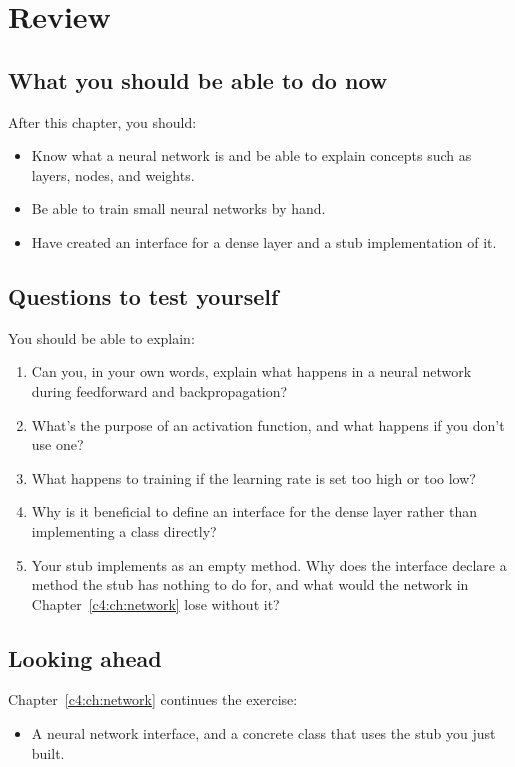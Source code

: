 
\section{Review}
\label{c3:sec:review}

\subsection*{What you should be able to do now}
After this chapter, you should:
\begin{itemize}
  \item Know what a neural network is and be able to explain concepts such as layers, nodes, and
    weights.
  \item Be able to train small neural networks by hand.
  \item Have created an interface for a dense layer and a stub implementation of it.
\end{itemize}

\subsection*{Questions to test yourself}
You should be able to explain:
\begin{enumerate}
  \item Can you, in your own words, explain what happens in a neural network during feedforward and
    backpropagation?
  \item What's the purpose of an activation function, and what happens if you don't use one?
  \item What happens to training if the learning rate is set too high or too low?
  \item Why is it beneficial to define an interface for the dense layer rather than implementing a
    class directly?
  \item Your stub implements  as an empty method. Why does the interface declare
    a method the stub has nothing to do for, and what would the network in
    Chapter~\ref{c4:ch:network} lose without it?
\end{enumerate}

\subsection*{Looking ahead}
Chapter~\ref{c4:ch:network} continues the exercise:
\begin{itemize}
  \item A neural network interface, and a concrete  class that uses the stub you just
    built.
\end{itemize}
